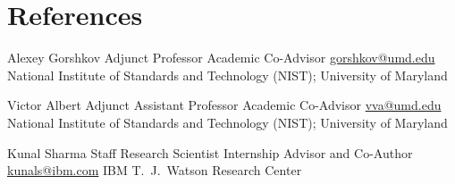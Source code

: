 \section{References}


\cventry
  {}
  {Alexey Gorshkov}
  {Adjunct Professor}
  {Academic Co-Advisor}
  {\href{mailto:gorshkov@umd.edu}{gorshkov@umd.edu}}
  {National Institute of Standards and Technology (NIST); University of Maryland}


\cventry
  {}
  {Victor Albert}
  {Adjunct Assistant Professor}
  {Academic Co-Advisor}
  {\href{mailto:vva@umd.edu}{vva@umd.edu}}
  {National Institute of Standards and Technology (NIST); University of Maryland}


\cventry
  {}
  {Kunal Sharma}
  {Staff Research Scientist}
  {Internship Advisor and Co-Author}
  {\href{mailto:kunals@ibm.com}{kunals@ibm.com}}
  {IBM T.~J.~Watson Research Center}


